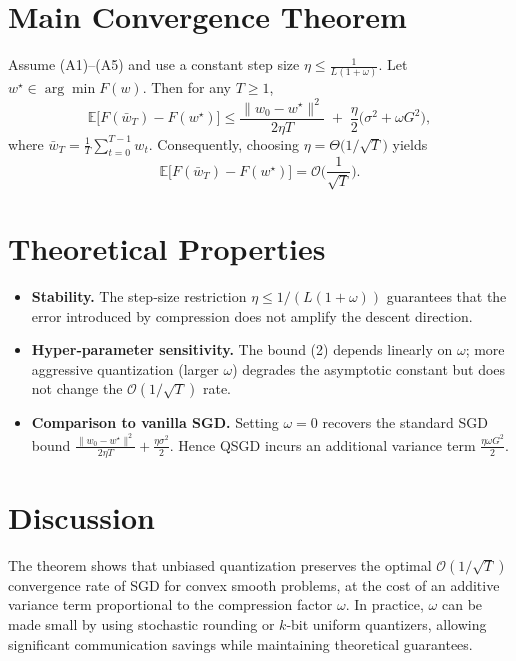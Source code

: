 \documentclass{article}
\begin{document}
\section*{Main Convergence Theorem}
\begin{theorem}\label{thm:main}
Assume (A1)–(A5) and use a constant step size $\eta\le \frac{1}{L(1+\omega)}$.
Let $w^\star\in\arg\min F(w)$. Then for any $T\ge1$,
\[
\boxed{
\mathbb{E}\!\big[ F(\bar w_T)-F(w^\star) \big] 
\le 
\frac{\|w_0-w^\star\|^{2}}{2\eta T}
\;+\;
\frac{\eta}{2}\big(\sigma^{2}+ \omega G^{2}\big)
},
\tag{2}
\]
where $\bar w_T=\frac1T\sum_{t=0}^{T-1} w_t$.
Consequently, choosing $\eta = \Theta\!\big(1/\sqrt{T}\big)$ yields
\[
\mathbb{E}\!\big[ F(\bar w_T)-F(w^\star) \big]=
\mathcal{O}\!\Big(\frac{1}{\sqrt{T}}\Big).
\]
\end{theorem}

\section*{Theoretical Properties}
\begin{itemize}
\item \textbf{Stability.} The step‑size restriction $\eta\le 1/(L(1+\omega))$
guarantees that the error introduced by compression does not amplify
the descent direction.
\item \textbf{Hyper‑parameter sensitivity.} The bound (2) depends linearly
on $\omega$; more aggressive quantization (larger $\omega$) degrades the
asymptotic constant but does not change the $\mathcal{O}(1/\sqrt{T})$ rate.
\item \textbf{Comparison to vanilla SGD.} Setting $\omega=0$ recovers the
standard SGD bound $\frac{\|w_0-w^\star\|^{2}}{2\eta T}+ \frac{\eta\sigma^{2}}{2}$.
Hence QSGD incurs an additional variance term $\frac{\eta\omega G^{2}}{2}$.
\end{itemize}

\section*{Discussion}
The theorem shows that unbiased quantization preserves the optimal
$\mathcal{O}(1/\sqrt{T})$ convergence rate of SGD for convex smooth
problems, at the cost of an additive variance term proportional to the
compression factor $\omega$.  In practice, $\omega$ can be made small
by using stochastic rounding or $k$‑bit uniform quantizers, allowing
significant communication savings while maintaining theoretical
guarantees.
\end{document}
